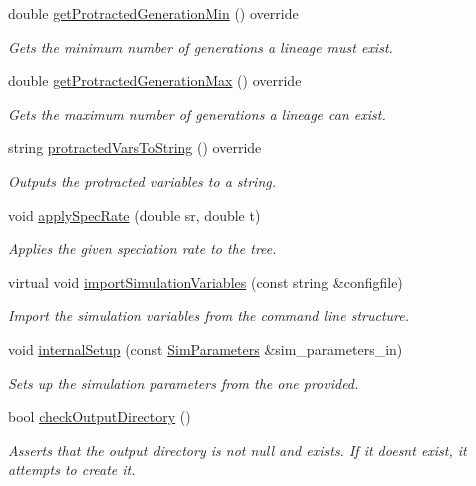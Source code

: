 \begin{DoxyCompactItemize}
double \hyperlink{class_protracted_tree_a331561815abc7d595e88d98e9268e7a1}{get\+Protracted\+Generation\+Min} () override
\begin{DoxyCompactList}\small\item\em Gets the minimum number of generations a lineage must exist. \end{DoxyCompactList}\item 
double \hyperlink{class_protracted_tree_a2093dd13cdbfc66e6c1de1406023bad6}{get\+Protracted\+Generation\+Max} () override
\begin{DoxyCompactList}\small\item\em Gets the maximum number of generations a lineage can exist. \end{DoxyCompactList}\item 
string \hyperlink{class_protracted_tree_a505a464578e6a7028e66f26b3e6b4a92}{protracted\+Vars\+To\+String} () override
\begin{DoxyCompactList}\small\item\em Outputs the protracted variables to a string. \end{DoxyCompactList}\item 
void \hyperlink{class_protracted_tree_a56a3631e65bb91d04ba4626c4c1ea79a}{apply\+Spec\+Rate} (double sr, double t)
\begin{DoxyCompactList}\small\item\em Applies the given speciation rate to the tree. \end{DoxyCompactList}\item 
virtual void \hyperlink{class_tree_a455d87022772b309a5974ea5f0295139}{import\+Simulation\+Variables} (const string \&configfile)
\begin{DoxyCompactList}\small\item\em Import the simulation variables from the command line structure. \end{DoxyCompactList}\item 
void \hyperlink{class_tree_a62db83e47e5850c6a83793829b22b68b}{internal\+Setup} (const \hyperlink{struct_sim_parameters}{Sim\+Parameters} \&sim\+\_\+parameters\+\_\+in)
\begin{DoxyCompactList}\small\item\em Sets up the simulation parameters from the one provided. \end{DoxyCompactList}\item 
bool \hyperlink{class_tree_a5c6065ede9862e9fb6561eb8beaf5d78}{check\+Output\+Directory} ()
\begin{DoxyCompactList}\small\item\em Asserts that the output directory is not null and exists. If it doesn\textquotesingle{}t exist, it attempts to create it. \end{DoxyCompactList}\item 

\end{DoxyCompactItemize}
